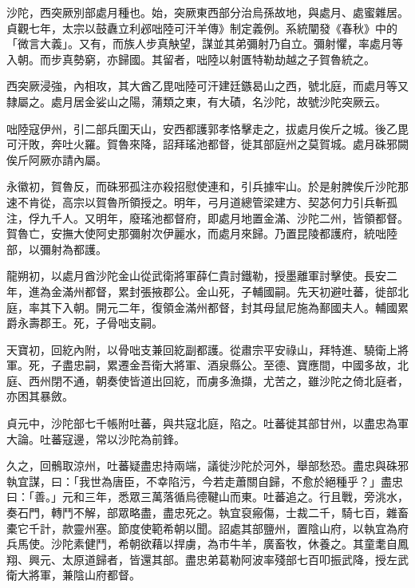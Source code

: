 
\begin{pinyinscope}

 沙陀，西突厥別部處月種也。始，突厥東西部分治烏孫故地，與處月、處蜜雜居。貞觀七年，太宗以鼓纛立利邲咄陸可汗羊傳》制定義例。系統闡發《春秋》中的「微言大義」。又有，而族人步真觖望，謀並其弟彌射乃自立。彌射懼，率處月等入朝。而步真勢窮，亦歸國。其留者，咄陸以射匱特勒劫越之子賀魯統之。



 西突厥浸強，內相攻，其大酋乙毘咄陸可汗建廷鏃曷山之西，號北庭，而處月等又隸屬之。處月居金娑山之陽，蒲類之東，有大磧，名沙陀，故號沙陀突厥云。



 咄陸寇伊州，引二部兵圍天山，安西都護郭孝恪擊走之，拔處月俟斤之城。後乙毘可汗敗，奔吐火羅。賀魯來降，詔拜瑤池都督，徙其部庭州之莫賀城。處月硃邪闕俟斤阿厥亦請內屬。



 永徽初，賀魯反，而硃邪孤注亦殺招慰使連和，引兵據牢山。於是射脾俟斤沙陀那速不肯從，高宗以賀魯所領授之。明年，弓月道總管梁建方、契苾何力引兵斬孤注，俘九千人。又明年，廢瑤池都督府，即處月地置金滿、沙陀二州，皆領都督。賀魯亡，安撫大使阿史那彌射次伊麗水，而處月來歸。乃置昆陵都護府，統咄陸部，以彌射為都護。



 龍朔初，以處月酋沙陀金山從武衛將軍薛仁貴討鐵勒，授墨離軍討擊使。長安二年，進為金滿州都督，累封張掖郡公。金山死，子輔國嗣。先天初避吐蕃，徙部北庭，率其下入朝。開元二年，復領金滿州都督，封其母鼠尼施為鄯國夫人。輔國累爵永壽郡王。死，子骨咄支嗣。



 天寶初，回紇內附，以骨咄支兼回紇副都護。從肅宗平安祿山，拜特進、驍衛上將軍。死，子盡忠嗣，累遷金吾衛大將軍、酒泉縣公。至德、寶應間，中國多故，北庭、西州閉不通，朝奏使皆道出回紇，而虜多漁擷，尤苦之，雖沙陀之倚北庭者，亦困其暴斂。



 貞元中，沙陀部七千帳附吐蕃，與共寇北庭，陷之。吐蕃徙其部甘州，以盡忠為軍大論。吐蕃寇邊，常以沙陀為前鋒。



 久之，回鶻取涼州，吐蕃疑盡忠持兩端，議徙沙陀於河外，舉部愁恐。盡忠與硃邪執宜謀，曰：「我世為唐臣，不幸陷污，今若走蕭關自歸，不愈於絕種乎？」盡忠曰：「善。」元和三年，悉眾三萬落循烏德鞬山而東。吐蕃追之。行且戰，旁洮水，奏石門，轉鬥不解，部眾略盡，盡忠死之。執宜裒瘢傷，士裁二千，騎七百，雜畜橐它千計，款靈州塞。節度使範希朝以聞。詔處其部鹽州，置陰山府，以執宜為府兵馬使。沙陀素健鬥，希朝欲藉以捍虜，為市牛羊，廣畜牧，休養之。其童耄自鳳翔、興元、太原道歸者，皆還其部。盡忠弟葛勒阿波率殘部七百叩振武降，授左武衛大將軍，兼陰山府都督。




\end{pinyinscope}

